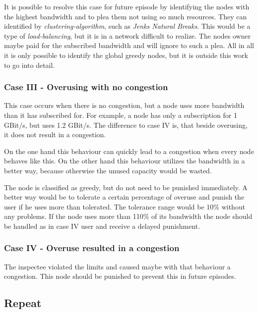 \documentclass[thesis.tex]{subfiles}
\begin{document}
It is possible to resolve this case for future episode by identifying the nodes with the highest bandwidth and to plea them not using so much resources. They can identified by \textit{clustering-algorithm}, such as \textit{Jenks Natural Breaks}. This would be a type of \textit{load-balancing}, but it is in a network difficult to realize. The nodes owner maybe paid for the subscribed bandwidth and will ignore to such a plea. All in all it is only possible to identify the global greedy nodes, but it is outside this work to go into detail.


\subsubsection{Case III - Overusing with no congestion}
This case occurs when there is no congestion, but a  node uses more bandwidth than it has subscribed for. For example, a node has only a subscription for 1 GBit/s, but uses 1.2 GBit/s. The difference to case IV is, that beside overusing, it does not result in a congestion.

On the one hand this behaviour can quickly lead to a congestion when every node behaves like this. On the other hand this behaviour utilizes the bandwidth in a better way, because otherwise the unused capacity would be wasted.

The node is classified as greedy, but do not need to be punished immediately. A better way would be to tolerate a certain percentage of overuse and punish the user if he uses more than tolerated. The tolerance range would be 10\% without any problems. If the node uses more than 110\% of its bandwidth the node should be handled as in case IV user and receive a delayed punishment.


\subsubsection{Case IV - Overuse resulted in a congestion}
The inspectee violated the limits and caused maybe with that behaviour a congestion. This node should be punished to prevent this in future episodes.

\subsection{Repeat}
\end{document}
